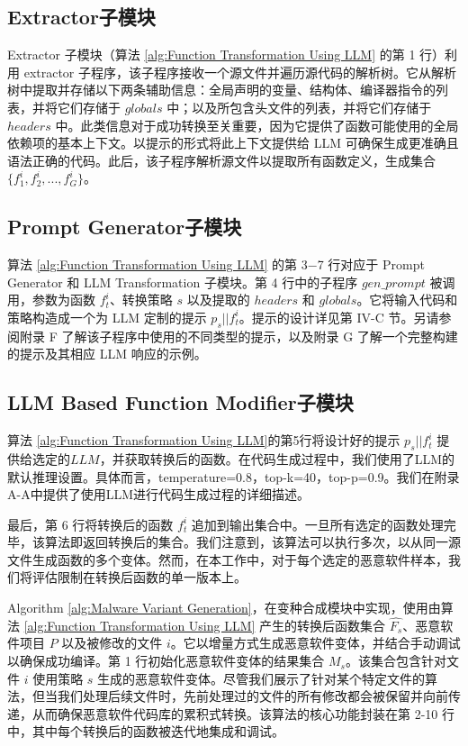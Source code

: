 \subsection{Extractor子模块}
Extractor 子模块（算法 \ref{alg:Function Transformation Using LLM} 的第 1 行）利用 extractor 子程序，该子程序接收一个源文件并遍历源代码的解析树。它从解析树中提取并存储以下两条辅助信息：全局声明的变量、结构体、编译器指令的列表，并将它们存储于 $globals$ 中；以及所包含头文件的列表，并将它们存储于 $headers$ 中。此类信息对于成功转换至关重要，因为它提供了函数可能使用的全局依赖项的基本上下文。以提示的形式将此上下文提供给 LLM 可确保生成更准确且语法正确的代码。此后，该子程序解析源文件以提取所有函数定义，生成集合$\{f_{1}^{i},f_{2}^{i},...,f_{G}^{i}\}$。

\subsection{Prompt Generator子模块}
算法 \ref{alg:Function Transformation Using LLM} 的第 3−7 行对应于 Prompt Generator 和 LLM Transformation 子模块。第 4 行中的子程序 $gen\_prompt$ 被调用，参数为函数 $f_t^{i}$、转换策略 $s$ 以及提取的 $headers$ 和 $globals$。它将输入代码和策略构造成一个为 LLM 定制的提示 $p_{s}||f_{t}^{i}$。提示的设计详见第 IV-C 节。另请参阅附录 F 了解该子程序中使用的不同类型的提示，以及附录 G 了解一个完整构建的提示及其相应 LLM 响应的示例。

\subsection{LLM Based Function Modifier子模块}
算法 \ref{alg:Function Transformation Using LLM}的第5行将设计好的提示 $p_{s}||f_{t}^{i}$ 提供给选定的$LLM$，并获取转换后的函数。在代码生成过程中，我们使用了LLM的默认推理设置。具体而言，temperature=0.8，top-k=40，top-p=0.9。我们在附录A-A中提供了使用LLM进行代码生成过程的详细描述。

最后，第 6 行将转换后的函数 $f_{t}^{i}$ 追加到输出集合中。一旦所有选定的函数处理完毕，该算法即返回转换后的集合。我们注意到，该算法可以执行多次，以从同一源文件生成函数的多个变体。然而，在本工作中，对于每个选定的恶意软件样本，我们将评估限制在转换后函数的单一版本上。

Algorithm \ref{alg:Malware Variant Generation}，在变种合成模块中实现，使用由算法 \ref{alg:Function Transformation Using LLM} 产生的转换后函数集合 $\hat{F_{s}}$、恶意软件项目 $P$ 以及被修改的文件 $i$。它以增量方式生成恶意软件变体，并结合手动调试以确保成功编译。第 1 行初始化恶意软件变体的结果集合 $M_{s}$。该集合包含针对文件 $i$ 使用策略 $s$ 生成的恶意软件变体。尽管我们展示了针对某个特定文件的算法，但当我们处理后续文件时，先前处理过的文件的所有修改都会被保留并向前传递，从而确保恶意软件代码库的累积式转换。该算法的核心功能封装在第 2-10 行中，其中每个转换后的函数被迭代地集成和调试。

